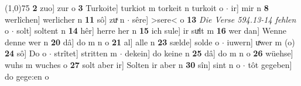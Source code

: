 \documentclass[8pt,a4paper,notitlepage]{article}
\begin{document}
\begin{table}[ht]
\begin{minipage}[t]{0.5\linewidth}
\newline
\line(1,0){75} \newline
\textbf{2} zuo] zur o \textbf{3} Turkoite] turkiot m torkeit n turkoit o  $\cdot$ ir] mir n \textbf{8} werlîchen] werlicher n \textbf{11} sô] zuͯ n  $\cdot$ sêre] >sere< o \textbf{13} \textit{Die Verse 594.13-14 fehlen} o   $\cdot$ solt] soltent n \textbf{14} hêr] herre her n \textbf{15} ich sule] ir suͯlt m \textbf{16} wer dan] Wenne denne wer n \textbf{20} dâ] do m n o \textbf{21} al] alle n \textbf{23} sælde] solde o  $\cdot$ iuwern] uͯwer m (o) \textbf{24} sô] Do o  $\cdot$ strîtet] stritten m  $\cdot$ dekein] do keine n \textbf{25} dâ] do m n o \textbf{26} wüehse] wuhs m wuches o \textbf{27} solt aber ir] Solten ir aber n \textbf{30} sîn] sint n o  $\cdot$ tôt gegeben] do gege:en o \newline
\end{minipage}
\end{table}
\newpage
\end{document}
